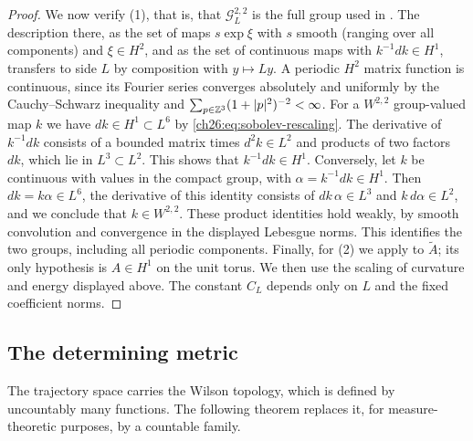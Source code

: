 \begin{proof}
We now verify (1), that is, that $\mathcal G^{2,2}_L$ is the full group used in \cite{CCState2023v4}. The description there, as the set of maps $s\exp\xi$ with $s$ smooth (ranging over all components) and $\xi\in H^2$, and as the set of continuous maps with $k^{-1}dk\in H^1$, transfers to side $L$ by composition with $y\mapsto Ly$. A periodic $H^2$ matrix function is continuous, since its Fourier series converges absolutely and uniformly by the Cauchy--Schwarz inequality and $\sum_{p\in\mathbb Z^3}(1+\lvert p\rvert^2)^{-2}<\infty$. For a $W^{2,2}$ group-valued map $k$ we have $dk\in H^1\subset L^6$ by \eqref{ch26:eq:sobolev-rescaling}. The derivative of $k^{-1}dk$ consists of a bounded matrix times $d^2k\in L^2$ and products of two factors $dk$, which lie in $L^3\subset L^2$. This shows that $k^{-1}dk\in H^1$. Conversely, let $k$ be continuous with values in the compact group, with $\alpha=k^{-1}dk\in H^1$. Then $dk=k\alpha\in L^6$, the derivative of this identity consists of $dk\,\alpha\in L^3$ and $k\,d\alpha\in L^2$, and we conclude that $k\in W^{2,2}$. These product identities hold weakly, by smooth convolution and convergence in the displayed Lebesgue norms. This identifies the two groups, including all periodic components. Finally, for (2) we apply \cite[Lemma 3.7]{CCState2023v4} to $\widetilde A$; its only hypothesis is $A\in H^1$ on the unit torus. We then use the scaling of curvature and energy displayed above. The constant $C_L$ depends only on $L$ and the fixed coefficient norms.
\end{proof}

\subsection{The determining metric}

The trajectory space carries the Wilson topology, which is defined by uncountably many functions. The following theorem replaces it, for measure-theoretic purposes, by a countable family.

